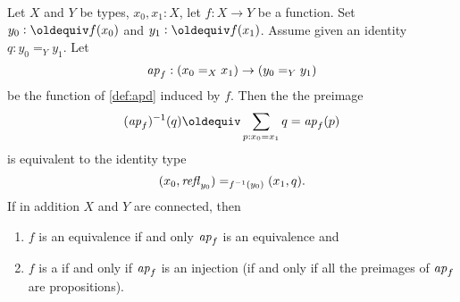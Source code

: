 \begin{lemma}
  \label{lem:eqandcovofconntypes}
  Let $X$ and $Y$ be types, $x_0,x_1:X$, let $f:X\to Y$ be a function.  Set $y_0\defequi f(x_0)$ and $y_1\defequi f(x_1)$. Assume given an identity $q:y_0=_Yy_1$. Let 
    $$%
\ap f:(x_0=_Xx_1)\to (y_0=_Yy_1)$$
be the function of \cref{def:apd} induced by $f$.  Then the  the preimage 
$$(\ap f)^{-1}(q)\oldequiv\sum_{p:x_0=x_1}q=\ap f(p)$$ is equivalent to the identity type 
 $$(x_0,\mathop{{\it refl}_{y_0}})=_{f^{-1}(y_0)}(x_1,q).$$ 
If in addition $X$ and $Y$ are connected, then
\begin{enumerate}
\item $f$ is an equivalence if and only $\ap f%
$ is an equivalence and
\item $f$ is a \covering if and only if  $\ap f%
$ is an injection (\ie if and only if all the preimages of $\mathop{{\it ap}_{f}}$ are propositions).
\end{enumerate}

\end{lemma}
